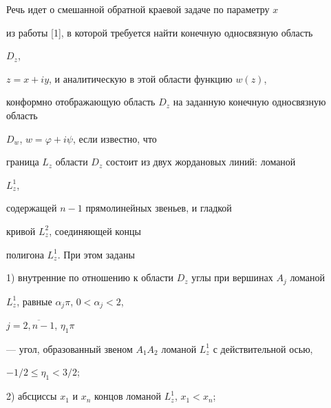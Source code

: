 \date{}







\pagestyle{plain} %













\maketitle


\label{begin}





Речь идет о смешанной обратной краевой задаче по параметру $x$


из работы [1], в которой требуется найти конечную односвязную область


$D_z$,


$z=x+iy$, и аналитическую в этой области функцию $w(z)$,


конформно отображающую область $D_z$ на заданную конечную односвязную область


$D_w$, $w=\varphi+i\psi$, если известно, что


граница $L_z$ области $D_z$ состоит из двух жордановых линий: ломаной


$L_z^1$,


содержащей $n-1$ прямолинейных звеньев, и гладкой 


кривой $L_z^2$, соединяющей концы


полигона $L_z^1$. При этом заданы





1) внутренние по отношению к области $D_z$ углы при вершинах $A_j$ ломаной


$L_z^1$, равные $\alpha_j\pi$, $0<\alpha_j<2$,


$j=\overline{2,n-1}$, $\eta_1\pi$


--- угол, образованный звеном $A_1A_2$ ломаной $L_z^1$ с действительной осью,


$-1/2\le\eta_1<3/2$;





2) абсциссы $x_1$ и $x_n$ концов ломаной $L_z^1$, $x_1<x_n$;






